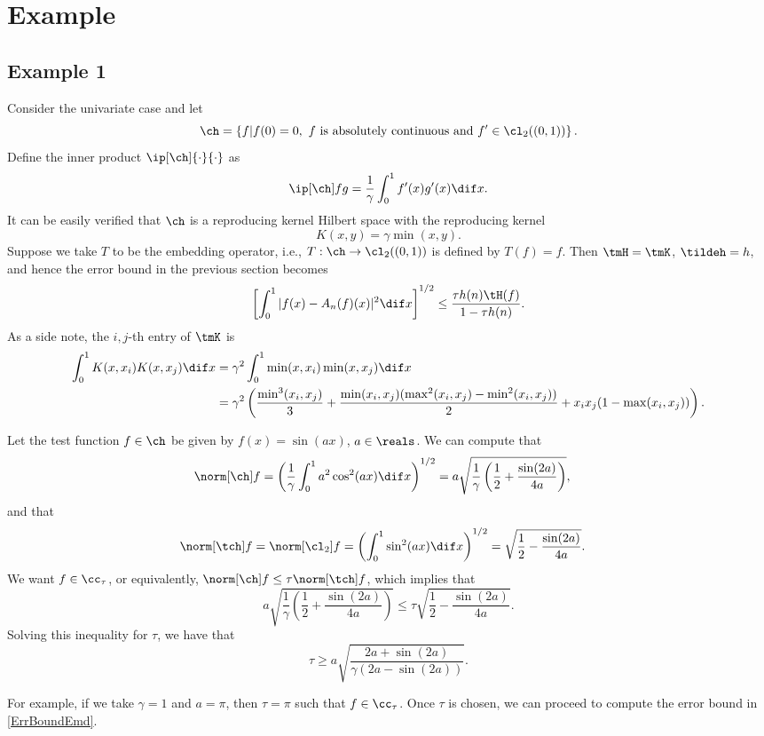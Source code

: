 \documentclass[11pt]{amsart}
\newcommand{\g}{\gamma}
\theoremstyle{definition}
\begin{document}
\section{Example}
\subsection{Example 1}
Consider the univariate case and let 
$$\ch=\left\{f|f(0)=0,\ f\mbox{ is absolutely continuous and }f'\in\cl_2((0,1))\right\}.$$
Define the inner product $\ip[\ch]{\cdot}{\cdot}$ as
$$\ip[\ch]fg=\frac1\g\int_0^1f'(x)g'(x)\dif x.$$
It can be easily verified that $\ch$ is a reproducing kernel Hilbert space with the reproducing kernel
$$K(x,y)=\g\min(x,y).$$
Suppose we take $T$ to be the embedding operator, i.e., $T:\ch\to\cl_2((0,1))$ is defined by $T(f)=f$. Then $\tmH=\tmK$, $\tildeh=h$, and hence the error bound in the previous section becomes
\begin{equation}\label{ErrBoundEmd}
\left[\int_0^1|f(x)-A_n(f)(x)|^2\dif x\right]^{1/2}\le\frac{\tau h(n)\tH(f)}{1-\tau h(n)}.
\end{equation}
As a side note, the $i,j$-th entry of $\tmK$ is
\begin{align*}
\int_0^1K(x,x_i)K(x,x_j)\dif x&=\g^2\int_0^1\min(x,x_i)\min(x,x_j)\dif x\\
&=\g^2\left(\frac{\min^3(x_i,x_j)}3+\frac{\min(x_i,x_j)(\max^2(x_i,x_j)-\min^2(x_i,x_j))}2+x_ix_j(1-\max(x_i,x_j))\right).
\end{align*}

Let the test function $f\in\ch$ be given by $f(x)=\sin(ax)$, $a\in\reals$. We can compute that
\begin{align*}
\norm[\ch]f&=\left(\frac1\g\int_0^1a^2\cos^2(ax)\dif x\right)^{1/2}=a\sqrt{\frac1\g\left(\frac12+\frac{\sin(2a)}{4a}\right)},
\end{align*}
and that
\begin{align*}
\norm[\tch]f&=\norm[\cl_2]f=\left(\int_0^1\sin^2(ax)\dif x\right)^{1/2}=\sqrt{\frac12-\frac{\sin(2a)}{4a}}.
\end{align*}
We want $f\in\cc_\tau$, or equivalently, $\norm[\ch]f\le\tau\norm[\tch]f$, which implies that
$$a\sqrt{\frac1\g\left(\frac12+\frac{\sin(2a)}{4a}\right)}\le\tau\sqrt{\frac12-\frac{\sin(2a)}{4a}}.$$
Solving this inequality for $\tau$, we have that
$$\tau\ge a\sqrt{\frac{2a+\sin(2a)}{\g(2a-\sin(2a))}}.$$

For example, if we take $\g=1$ and $a=\pi$, then $\tau=\pi$ such that $f\in\cc_\tau$. Once $\tau$ is chosen, we can proceed to compute the error bound in \eqref{ErrBoundEmd}.
\end{document}
